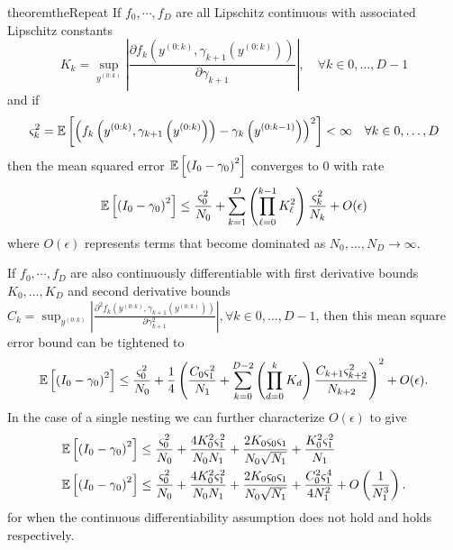 \begin{restatable}{theorem}{theRepeat}
	\label{the:Repeat} %
	If $f_0, \cdots, f_D$ are all Lipschitz continuous with associated Lipschitz 
	constants
	\[K_k = \sup_{y^{(0:k)}} \left| \frac{\partial f_k\left(y^{(0:k)},\gamma_{k+1}(y^{(0:k)})\right)}{\partial \gamma_{k+1}}\right|, \quad \forall k
	\in 0,\dots,D-1
	\]
	and if
	\[
	\varsigma_{k}^2  
	=\mathbb{E} \left[\left(f_k\left(y^{(0:k)},\gamma_{k+1}
	\left(y^{(0:k)}\right) \right)-\gamma_k\left(y^{(0:k-1)}\right)\right)^2\right] < \infty \quad \forall k\in 0,\dots,D
	\]
	then the mean squared error $\mathbb{E} \left[\left(I_0 - \gamma_0\right)^2\right] $ converges to $0$ with rate
	\begin{align}
	\label{eq:bound-lip}
	\mathbb{E} \left[\left(I_0 - \gamma_0\right)^2\right] \le
	\frac{\varsigma_{0}^2}{N_0} +
	\sum_{k=1}^{D} \left(\prod_{\ell=0}^{k-1} K_{\ell}^2\right)
	\frac{\varsigma_{k}^2}{N_{k}}+ O(\epsilon)
	\end{align}
	where $O(\epsilon)$ represents terms that become dominated as $N_0,\dots,N_D
	\rightarrow \infty$.
	
	If $f_0, \cdots, f_D$ are also continuously differentiable with first derivative bounds
	$K_0, \dots, K_D$ and second derivative bounds 
	$C_k = \sup_{y^{(0:k)}} \left|\frac{\partial^2 f_k\left(y^{(0:k)},\gamma_{k+1}(y^{(0:k)})\right)}{\partial \gamma^2_{k+1}}\right|, \forall k
	\in 0,\dots,D-1$, then this mean square error bound can be tightened to
	\begin{align}
	\label{eq:bound-cont}
	\mathbb{E} \left[\left(I_0 - \gamma_0\right)^2\right] \le 
	\frac{\varsigma_0^2}{N_0}
	+\frac{1}{4}\left(
	\frac{C_0 \varsigma_{1}^2}{N_{1}}
	+\sum_{k=0}^{D-2}  \left(\prod_{d=0}^{k} K_{d}\right)
	\frac{C_{k+1} \varsigma^2_{k+2}}{N_{k+2}}
	\right)^2 + O(\epsilon).
	\end{align}
	In the case of a single nesting we can further characterize $O(\epsilon)$ to give
	\begin{align}
	\mathbb{E} \left[\left(I_0 - \gamma_0\right)^2\right]  &\le \frac{\varsigma^2_0}{N_0}+\frac{4 K_{0}^2 \varsigma_1^2}{N_0 N_{1}}
	+\frac{2 K_{0}\varsigma_{0} \varsigma_1}{N_{0} \sqrt{N_1}}+\frac{K_0 ^2 \varsigma_1^2}{N_1} \\
	\mathbb{E} \left[\left(I_0 - \gamma_0\right)^2\right]  &\le \frac{\varsigma^2_0}{N_0}+\frac{4 K_{0}^2 \varsigma_1^2}{N_0 N_{1}}
	+\frac{2 K_{0}\varsigma_{0} \varsigma_1}{N_{0} \sqrt{N_1}}+\frac{C_0 ^2 \varsigma_1^4}{4 N_1^2}
	+ O\left(\frac{1}{N_1^{3}}\right).
	\end{align}
	for when the continuous differentiability assumption does not hold and 
	holds respectively.
\end{restatable}
